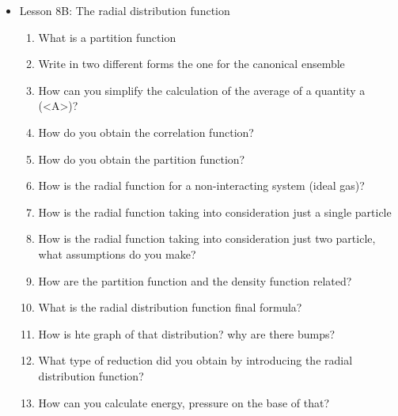 {\begin{itemize}
\begin{enumerate}
        \item What is the equipartition theorem?
        \item How do you find the amplitude of correlation g?
        \item What does the Fluctuation-Dissipation theorem say? What are the important points? What thermostat uses it? (langevin) $\rightarrow$ It correlates the random forces and the cappacity of diffusion.
        \item What is a Langevin thermostat? A Langevin thermostat is a mathematical and computational tool used in molecular dynamics simulations to mimic the effects of a thermal reservoir on a simulated system. It is commonly employed to maintain a desired temperature in the simulation by introducing a stochastic (random) force that mimics the collisions of the particles with the surrounding solvent or thermal bath.
    \end{enumerate}
    \item Lesson 8B: The radial distribution function
    \begin{enumerate}
        \item What is a partition function
        \item Write in two different forms the one for the canonical ensemble
        \item How can you simplify the calculation of the average of a quantity a (<A>)?
        \item How do you obtain the correlation function?
        \item How do you obtain the partition function?
        \item How is the radial function for a non-interacting system (ideal gas)?
        \item How is the radial function taking into consideration just a single particle
        \item How is the radial function taking into consideration just two particle, what assumptions do you make?
        \item How are the partition function and the density function related?
        \item What is the radial distribution function final formula?
        \item How is hte graph of that distribution? why are there bumps?
        \item What type of reduction did you obtain by introducing the radial distribution function?	
        \item How can you calculate energy, pressure on the base of that?

\end{enumerate}
\end{itemize}}
